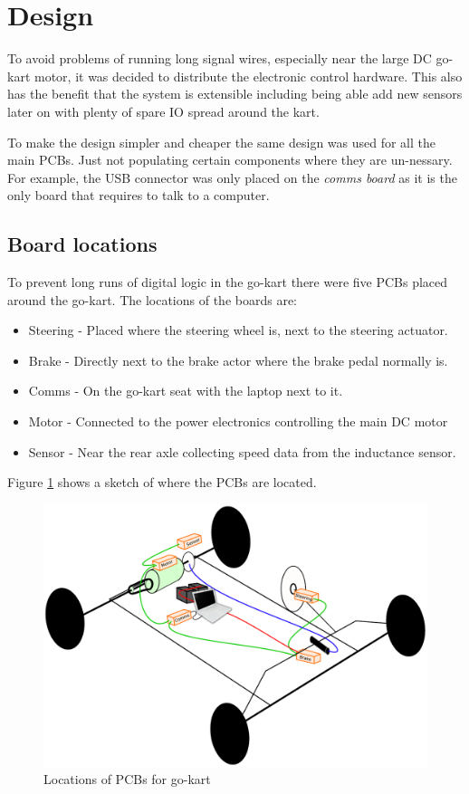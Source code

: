 \section{Design}
  To avoid problems of running long signal wires, especially near the large DC
  go-kart motor, it was decided to distribute the electronic control hardware.
  This also has the benefit that the system is extensible including being able
  add new sensors later on with plenty of spare IO spread around the kart.

  To make the design simpler and cheaper the same design was used for all the
  main PCBs. Just not populating certain components where they are un-nessary.
  For example, the USB connector was only placed on the \emph{comms board} as it
  is the only board that requires to talk to a computer.

  \subsection{Board locations}
  To prevent long runs of digital logic in the go-kart there were five PCBs
  placed around the go-kart. The locations of the boards are:
  \begin{itemize}
  \item Steering - Placed where the steering wheel is, next to the steering
  actuator.
  \item Brake - Directly next to the brake actor where the brake pedal normally
  is.
  \item Comms - On the go-kart seat with the laptop next to it.
  \item Motor - Connected to the power electronics controlling the main DC motor
  \item Sensor - Near the rear axle collecting speed data from the inductance
  sensor.
  \end{itemize}
  Figure \ref{locations} shows a sketch of where the PCBs are located.

  \begin{figure}[h]
    \centering
    \includegraphics[width=\linewidth]{Images/layout}
    \caption{Locations of PCBs for go-kart}
    \label{locations}
  \end{figure}


